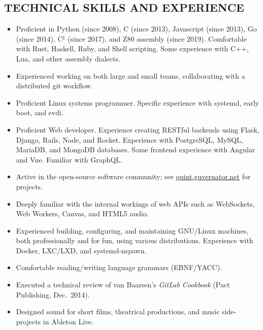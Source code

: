 \documentclass{res}     %
\begin{document}
\begin{resume}
\section{TECHNICAL SKILLS AND EXPERIENCE}
\vspace{5mm}
\begin{itemize}[leftmargin=5mm]
\item Proficient in
Python (since 2008),
C (since 2013),
Javascript (since 2013),
Go (since 2014),
C$^\sharp$ (since 2017),
and
Z80 assembly (since 2019).
Comfortable with
Rust,
Haskell,
Ruby,
and Shell scripting.
Some experience with
C++,
Lua,
and other assembly dialects.
\item Experienced working on both large and small teams, collaborating with a distributed git workflow.
\item Proficient Linux systems programmer. Specific experience with systemd, early boot, and evdi.
\item Proficient Web developer. Experience creating RESTful backends using Flask, Django, Rails, Node, and Rocket. Experience with PostgreSQL, MySQL, MariaDB, and MongoDB databases. Some frontend experience with Angular and Vue. Familiar with GraphQL.
\item Active in the open-source software community; see \url{quint.guvernator.net} for projects.
\item Deeply familiar with the internal workings of web APIs such as WebSockets, Web Workers, Canvas, and HTML5 audio.
\item Experienced building, configuring, and maintaining GNU/Linux machines, both professionally and for fun, using various distributions. Experience with Docker, LXC/LXD, and systemd-nspawn.
\item Comfortable reading/writing language grammars (EBNF/YACC).
\item Executed a technical review of van Baarsen's \emph{GitLab Cookbook} (Pact Publishing, Dec.\ 2014).
\item Designed sound for short films, theatrical productions, and music side-projects in Ableton Live. %
\end{itemize}


\end{resume}
\end{document}
